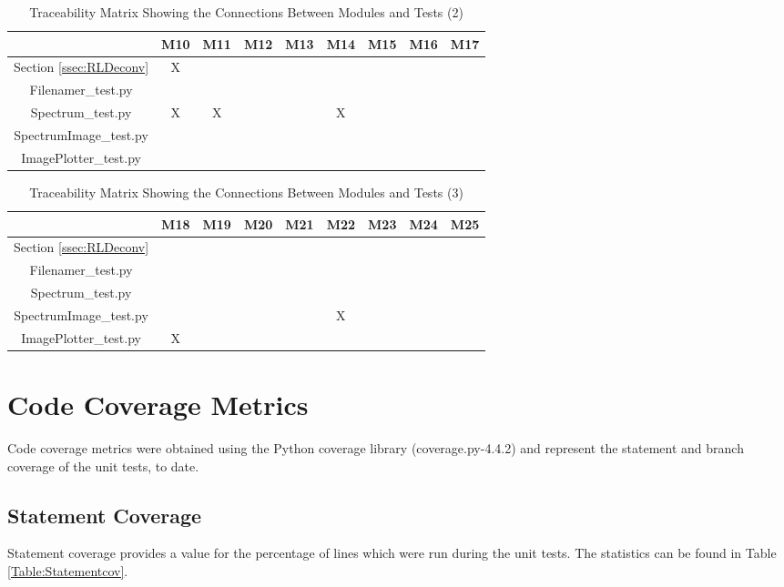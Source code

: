 \documentclass[12pt, titlepage]{article}
\begin{document}
\begin{table}[h!]
    \centering
    \begin{tabular}{|c|c|c|c|c|c|c|c|c|}
        \hline
        & M10 & M11 & M12 & M13 & M14 & M15 & M16 & M17 \\
        \hline
        Section \ref{ssec:RLDeconv} & X & & & & & & & \\ \hline
        Filenamer\_test.py & & & & & & & & \\ \hline
        Spectrum\_test.py & X & X & & & X & & & \\ \hline
        SpectrumImage\_test.py & & & & & &  & & \\ \hline
        ImagePlotter\_test.py & & & & & &  & & \\ \hline
    \end{tabular}
    \caption{Traceability Matrix Showing the Connections Between Modules and Tests (2)}
    \label{Table:M_trace2}
\end{table}

\begin{table}[h!]
    \centering
    \begin{tabular}{|c|c|c|c|c|c|c|c|c|}
        \hline
        & M18 & M19 & M20 & M21 & M22 & M23 & M24 & M25 \\
        \hline
        Section \ref{ssec:RLDeconv} & & & & & & & & \\ \hline
        Filenamer\_test.py & & & & & & & & \\ \hline
        Spectrum\_test.py & & & & & & & & \\ \hline
        SpectrumImage\_test.py & & & & & X &  & & \\ \hline
        ImagePlotter\_test.py & X & & & & &  & & \\ \hline
    \end{tabular}
    \caption{Traceability Matrix Showing the Connections Between Modules and Tests (3)}
    \label{Table:M_trace3}
\end{table}

\section{Code Coverage Metrics}
Code coverage metrics were obtained using the Python coverage library
(coverage.py-4.4.2) and represent the statement and branch coverage of the unit
tests, to date. 

\subsection{Statement Coverage}
Statement coverage provides a value for the percentage of lines which were run
during the unit tests. The statistics can be found in Table \ref{Table:Statementcov}.
\end{document}
